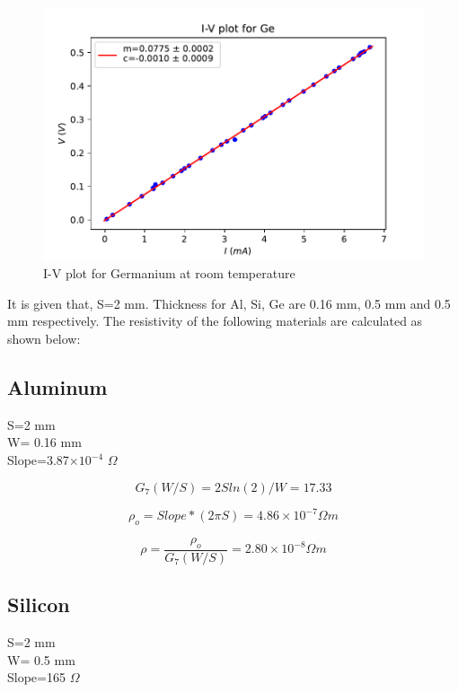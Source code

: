 \documentclass[a4paper, amsfonts, amssymb, amsmath, reprint, showkeys, nofootinbib, twoside]{revtex4-1}
\begin{document}
\begin{figure}[H]
	\centering
	\includegraphics[scale=0.5]{ge}
	\caption{I-V plot for Germanium at room temperature}
	\label{ge}
\end{figure}

It is given that, S=2 mm. Thickness for Al, Si, Ge are 0.16 mm, 0.5 mm and 0.5 mm respectively.
The resistivity of the following materials are calculated as shown below: 

\subsection{Aluminum}
\begin{center}
	S=2 mm\\W= 0.16 mm\\Slope=3.87$\times10^{-4}$ $\Omega$
\end{center}

\begin{equation}
	G_7(W/S)=2Sln(2)/W=17.33
\end{equation}

\begin{equation}
	\rho_o=Slope*(2\pi S)=4.86\times 10^{-7}\Omega m
\end{equation}

\begin{equation}
	\rho=\frac{\rho_o}{G_7(W/S)}=2.80\times10^{-8} \Omega m
\end{equation}

\subsection{Silicon}
\begin{center}
	S=2 mm\\W= 0.5 mm\\Slope=165 $\Omega$
\end{center}
\end{document}
